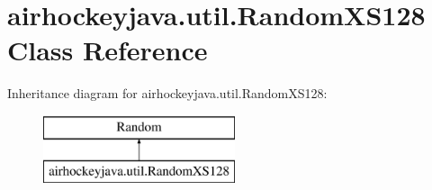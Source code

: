 \hypertarget{classairhockeyjava_1_1util_1_1_random_x_s128}{}\section{airhockeyjava.\+util.\+Random\+X\+S128 Class Reference}
\label{classairhockeyjava_1_1util_1_1_random_x_s128}
Inheritance diagram for airhockeyjava.\+util.\+Random\+X\+S128\+:\begin{figure}[H]
\begin{center}
\leavevmode
\includegraphics[height=2.000000cm]{classairhockeyjava_1_1util_1_1_random_x_s128}
\end{center}
\end{figure}
